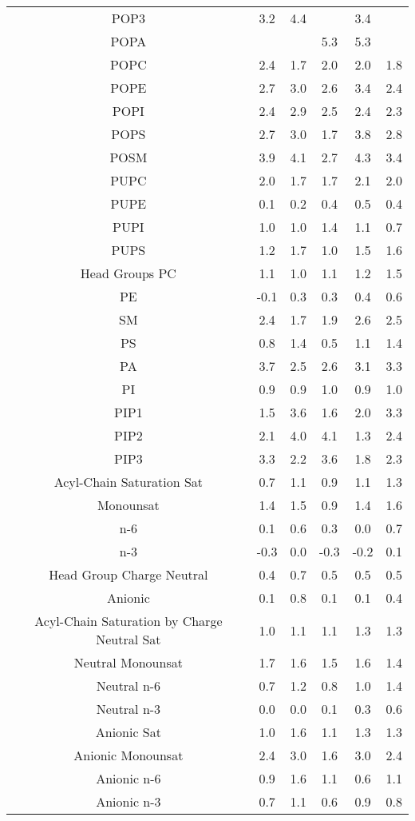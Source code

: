 \documentclass[9pt]{article}
\begin{document}
\begin{table}
{\begin{tabular}{| c || ccccc |}
POP3&3.2&4.4&            &3.4&            \\
POPA    &            &            &5.3&5.3&       \\     
POPC    &2.4&1.7&2.0&2.0&1.8\\
POPE    &2.7&3.0&2.6&3.4&2.4\\
POPI    &2.4&2.9&2.5&2.4&2.3\\
POPS    &2.7&3.0&1.7&3.8&2.8\\
POSM    &3.9&4.1&2.7&4.3&3.4\\
PUPC    &2.0&1.7&1.7&2.1&2.0\\
PUPE    &0.1&0.2&0.4&0.5&0.4\\
PUPI    &1.0&1.0&1.4&1.1&0.7\\
PUPS    &1.2&1.7&1.0&1.5&1.6\\
\hline
Head Groups 
PC      &1.1&1.0&1.1&1.2&1.5\\
PE      &-0.1&0.3&0.3&0.4&0.6\\
SM      &2.4&1.7&1.9&2.6&2.5\\
PS      &0.8&1.4&0.5&1.1&1.4\\
PA      &3.7&2.5&2.6&3.1&3.3\\
PI      &0.9&0.9&1.0&0.9&1.0\\
PIP1&1.5&3.6&1.6&2.0&3.3\\
PIP2&2.1&4.0&4.1&1.3&2.4\\
PIP3&3.3&2.2&3.6&1.8&2.3\\
\hline
Acyl-Chain Saturation 
Sat      &0.7&1.1&0.9&1.1&1.3\\
Monounsat      &1.4&1.5&0.9&1.4&1.6\\
n-6&0.1&0.6&0.3&0.0&0.7\\
n-3&-0.3&0.0&-0.3&-0.2&0.1\\
\hline
Head Group Charge 
Neutral &0.4&0.7&0.5&0.5&0.5\\
Anionic &0.1&0.8&0.1&0.1&0.4\\
\hline
Acyl-Chain Saturation by Charge 
Neutral Sat    &1.0&1.1&1.1&1.3&1.3\\
Neutral Monounsat    &1.7&1.6&1.5&1.6&1.4\\
Neutral n-6&0.7&1.2&0.8&1.0&1.4\\
Neutral n-3&0.0&0.0&0.1&0.3&0.6\\
\hline
Anionic Sat     &1.0&1.6&1.1&1.3&1.3\\
Anionic Monounsat    &2.4&3.0&1.6&3.0&2.4\\
Anionic n-6&0.9&1.6&1.1&0.6&1.1\\
Anionic n-3&0.7&1.1&0.6&0.9&0.8\\
\hline
\end{tabular}}
\end{table}
\end{document}
